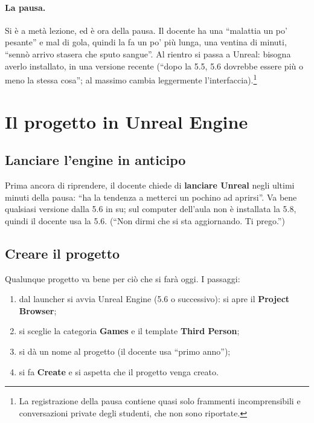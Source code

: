 \paragraph{La pausa.} Si è a metà lezione, ed è ora della pausa. Il docente ha
una ``malattia un po' pesante'' e mal di gola, quindi la fa un po' più lunga,
una ventina di minuti, ``sennò arrivo stasera che sputo sangue''. Al rientro
si passa a Unreal: bisogna averlo installato, in una versione recente (``dopo
la 5.5, 5.6 dovrebbe essere più o meno la stessa cosa''; al massimo cambia
leggermente l'interfaccia).\footnote{La registrazione della pausa contiene
quasi solo frammenti incomprensibili e conversazioni private degli studenti,
che non sono riportate.}

\section{Il progetto in Unreal Engine}
\label{gd8:sec:progetto}

\subsection{Lanciare l'engine in anticipo}

Prima ancora di riprendere, il docente chiede di \textbf{lanciare Unreal}
negli ultimi minuti della pausa: ``ha la tendenza a metterci un pochino ad
aprirsi''. Va bene qualsiasi versione dalla 5.6 in su; sul computer dell'aula
non è installata la 5.8, quindi il docente usa la 5.6. (``Non dirmi che si sta
aggiornando. Ti prego.'')

\subsection{Creare il progetto}

Qualunque progetto va bene per ciò che si farà oggi. I passaggi:
\begin{enumerate}
  \item dal launcher si avvia Unreal Engine (5.6 o successivo): si apre il
        \textbf{Project Browser};
  \item si sceglie la categoria \textbf{Games} e il template \textbf{Third
        Person};
  \item si dà un nome al progetto (il docente usa ``primo anno'');
  \item si fa \textbf{Create} e si aspetta che il progetto venga creato.
\end{enumerate}

